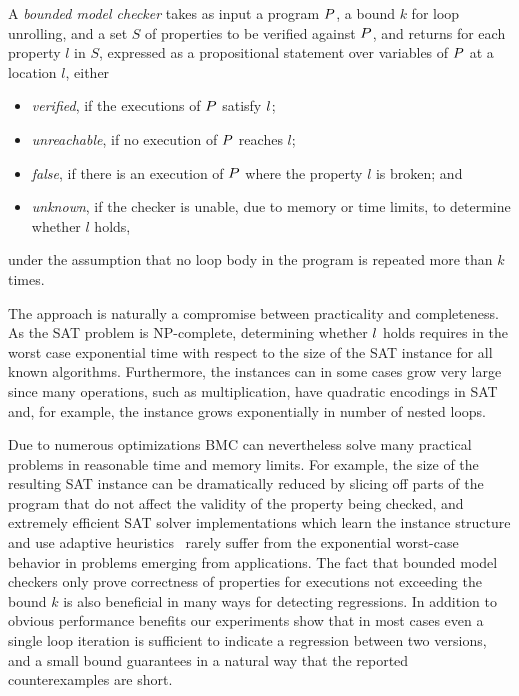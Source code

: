 A {\em bounded model checker} takes as input a program $P$, a bound $k$
for loop unrolling, and a set $S$ of properties to be verified against
$P$, and returns for each property ${l}$ in $S$, expressed as a propositional statement over variables of $P$ at a location $l$, either \vspace{-0.2cm}
\begin{itemize}
    \item \emph{verified}, if the executions of $P$  satisfy ${l}$;\vspace{-0.25cm}
    \item \emph{unreachable}, if no execution of $P$ reaches $l$;\vspace{-0.25cm}
    \item \emph{false}, if there is an execution of $P$
    where the property $l$ is broken; and\vspace{-0.25cm}
    \item \emph{unknown}, if the checker is unable, due to
    memory or time limits, to determine whether ${l}$ holds,\vspace{-0.2cm}
\end{itemize}
under the assumption that no loop body in the program is repeated more
than $k$ times.

The approach is naturally a compromise between practicality and
completeness.
As the SAT problem is NP-complete, determining whether ${l}$ holds
requires in the worst case exponential time with respect to the size of
the SAT instance for all known algorithms.
%
Furthermore, the instances can in some cases grow very large since many
operations, such as multiplication, have quadratic encodings in SAT and,
for example, the instance grows exponentially in number of nested loops.
%

Due to numerous optimizations BMC can nevertheless solve many practical
problems in reasonable time and memory limits.
%
For example, the size of the resulting SAT instance can be dramatically
reduced by slicing off parts of the program that do not affect the
validity of the property being checked, and
%
extremely efficient SAT solver implementations which learn the instance
structure and use adaptive heuristics~\cite{MahajanFM:SAT04} rarely
suffer from the exponential worst-case behavior in problems emerging
from applications.
%
The fact that bounded model checkers only prove correctness of
properties for executions not exceeding the bound $k$ is also beneficial
in many ways for detecting regressions.  In addition to obvious
performance benefits our experiments show that in most cases even a single
loop iteration is sufficient to indicate a regression between two
versions, and a small bound guarantees in a natural way that the
reported counterexamples are short.

